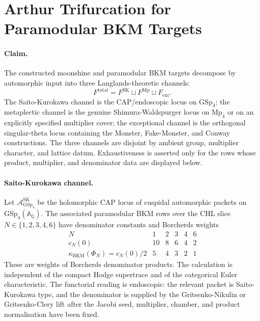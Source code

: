 \providecommand{\GSp}{\mathrm{GSp}}
\providecommand{\Sp}{\mathrm{Sp}}
\providecommand{\Mp}{\mathrm{Mp}}
\providecommand{\Oo}{\mathrm{O}}
\providecommand{\PGSp}{\mathrm{PGSp}}
\providecommand{\GSpin}{\mathrm{GSpin}}
\providecommand{\A}{\mathbb{A}}
\providecommand{\Q}{\mathbb{Q}}
\providecommand{\BKM}{\mathrm{BKM}}
\providecommand{\kBKM}{\kappa_{\mathrm{BKM}}}
\providecommand{\kch}{\kappa_{\mathrm{ch}}}
\providecommand{\kcat}{\kappa_{\mathrm{cat}}}
\providecommand{\kfiber}{\kappa_{\mathrm{fiber}}}
\providecommand{\kHeis}{\kappa_{\mathrm{ch}}^{\mathrm{Heis}}}
\providecommand{\cA}{\mathcal{A}}
\providecommand{\fg}{\mathfrak{g}}
\providecommand{\fm}{\mathfrak{m}}

\section{Arthur Trifurcation for Paramodular BKM Targets}
\label{wn:sec:arthur-trifurcation-o5}

\paragraph{Claim.}
The constructed moonshine and paramodular BKM targets decompose by
automorphic input into three Langlands-theoretic channels:
\[
F^{\mathrm{total}} =
F^{\mathrm{SK}}\sqcup F^{\mathrm{Mp}}\sqcup F_{\mathrm{exc}}.
\]
The Saito-Kurokawa channel is the CAP/endoscopic locus on $\GSp_4$;
the metaplectic channel is the genuine Shimura-Waldspurger locus on
$\Mp_4$ or on an explicitly specified multiplier cover; the exceptional
channel is the orthogonal singular-theta locus containing the Monster,
Fake-Monster, and Conway constructions. The three channels are disjoint
by ambient group, multiplier character, and lattice datum. Exhaustiveness
is asserted only for the rows whose product, multiplier, and denominator
data are displayed below.

\paragraph{Saito-Kurokawa channel.}
Let $\cA^{\mathrm{SK}}_{\GSp_4}$ be the holomorphic CAP locus of
cuspidal automorphic packets on $\GSp_4(\A_\Q)$. The associated
paramodular BKM rows over the CHL slice
$N\in\{1,2,3,4,6\}$ have denominator constants and Borcherds weights
\[
\begin{array}{c|ccccc}
N & 1 & 2 & 3 & 4 & 6\\ \hline
c_N(0) & 10 & 8 & 6 & 4 & 2\\
\kBKM(\Phi_N)=c_N(0)/2 & 5 & 4 & 3 & 2 & 1
\end{array}
\]
These are weights of Borcherds denominator products. The calculation is
independent of the compact Hodge supertrace and of the categorical Euler
characteristic. The functorial reading is endoscopic: the relevant packet
is Saito-Kurokawa type, and the denominator is supplied by the
Gritsenko-Nikulin or Gritsenko-Clery lift after the Jacobi seed,
multiplier, chamber, and product normalisation have been fixed.

